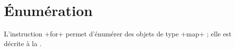 %
%
%
%
%
%
%
%
%
%
%




\section{Énumération}

L'instruction \ggsq+for+ permet d'énumérer des objets de type \ggsq+map+ ; elle est décrite à la .

